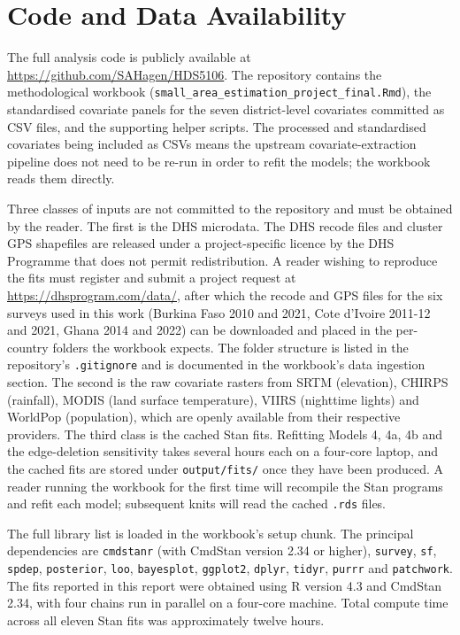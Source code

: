 \documentclass{article}
\begin{document}
\section{Code and Data Availability}\label{code-and-data-availability}

The full analysis code is publicly available at
\url{https://github.com/SAHagen/HDS5106}. The repository contains the
methodological workbook
(\texttt{small\_area\_estimation\_project\_final.Rmd}), the standardised
covariate panels for the seven district-level covariates committed as
CSV files, and the supporting helper scripts. The processed and
standardised covariates being included as CSVs means the upstream
covariate-extraction pipeline does not need to be re-run in order to
refit the models; the workbook reads them directly.

Three classes of inputs are not committed to the repository and must be
obtained by the reader. The first is the DHS microdata. The DHS recode
files and cluster GPS shapefiles are released under a project-specific
licence by the DHS Programme that does not permit redistribution. A
reader wishing to reproduce the fits must register and submit a project
request at \url{https://dhsprogram.com/data/}, after which the recode
and GPS files for the six surveys used in this work (Burkina Faso 2010
and 2021, Cote d'Ivoire 2011-12 and 2021, Ghana 2014 and 2022) can be
downloaded and placed in the per-country folders the workbook expects.
The folder structure is listed in the repository's \texttt{.gitignore}
and is documented in the workbook's data ingestion section. The second
is the raw covariate rasters from SRTM (elevation), CHIRPS (rainfall),
MODIS (land surface temperature), VIIRS (nighttime lights) and WorldPop
(population), which are openly available from their respective
providers. The third class is the cached Stan fits. Refitting Models 4,
4a, 4b and the edge-deletion sensitivity takes several hours each on a
four-core laptop, and the cached fits are stored under
\texttt{output/fits/} once they have been produced. A reader running the
workbook for the first time will recompile the Stan programs and refit
each model; subsequent knits will read the cached \texttt{.rds} files.

The full library list is loaded in the workbook's setup chunk. The
principal dependencies are \texttt{cmdstanr} (with CmdStan version 2.34
or higher), \texttt{survey}, \texttt{sf}, \texttt{spdep},
\texttt{posterior}, \texttt{loo}, \texttt{bayesplot}, \texttt{ggplot2},
\texttt{dplyr}, \texttt{tidyr}, \texttt{purrr} and \texttt{patchwork}.
The fits reported in this report were obtained using R version 4.3 and
CmdStan 2.34, with four chains run in parallel on a four-core machine.
Total compute time across all eleven Stan fits was approximately twelve
hours.



\end{document}
